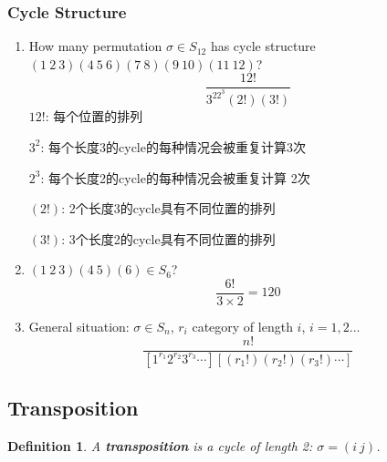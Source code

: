 \documentclass[11pt,a4paper]{article}
\newtheorem{definition}{Definition}
\begin{document}
\subsubsection{Cycle Structure}
\begin{enumerate}[$\bullet$]
    \item How many permutation $\sigma\in S_{12}$ has cycle structure $(1\ 2\ 3)(4\ 5\ 6)(7\ 8)(9\ 10)(11\ 12)$?
    $$\frac{12!}{3^22^3(2!)(3!)}$$
    $12!$: 每个位置的排列

    $3^2$: 每个长度3的cycle的每种情况会被重复计算3次

    $2^3$: 每个长度2的cycle的每种情况会被重复计算
    2次

    $(2!)$: 2个长度3的cycle具有不同位置的排列

    $(3!)$: 3个长度2的cycle具有不同位置的排列
    \item $(1\ 2\ 3)(4\ 5)(6)\in S_6$?
    $$\frac{6!}{3\times 2}=120$$
    \item General situation: $\sigma\in S_n$, $r_i$ category of length $i$, $i=1,2...$
    $$\frac{n!}{[1^{r_1}2^{r_2}3^{r_3}\cdots][(r_1!)(r_2!)(r_3!)\cdots]}$$
\end{enumerate}


\subsection{Transposition}
\begin{definition}
A \textbf{transposition} is a cycle of length 2: $\sigma=(i\ j)$.
\end{definition}
\end{document}

